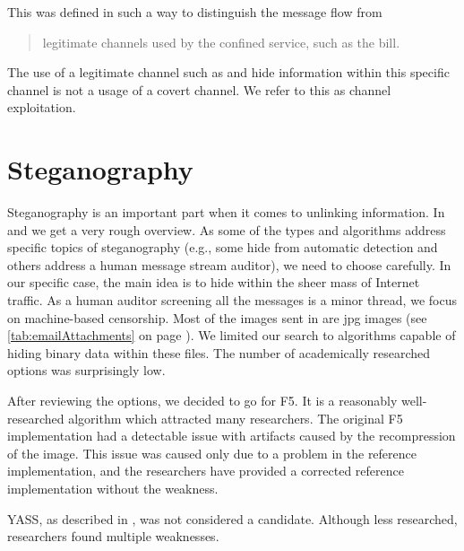 This was defined  in such a way to distinguish the message flow from 

\begin{quote}
	legitimate channels used by the confined service, such as the bill.
\end{quote}

The use of a legitimate channel such as  and hide information within this specific channel is not a usage of a covert channel. We refer to this as channel exploitation.

\section{Steganography}

Steganography is an important part when it comes to unlinking information. In \cite{6828087} and \cite{subhedar2014current} we get a very rough overview. As some of the types and algorithms address specific topics of steganography (e.g., some hide from automatic detection and others address a human message stream auditor), we need to choose carefully. In our specific case, the main idea is to hide within the sheer mass of Internet traffic. As a human auditor screening all the messages is a minor thread, we focus on machine-based censorship. Most of the images sent in  are jpg images (see \cref{tab:emailAttachments} on page \pageref{tab:emailAttachments}). We limited our search to algorithms capable of hiding binary data within these files. The number of academically researched options was surprisingly low.

After reviewing the options, we decided to go for F5\cite{f5}. It is a reasonably well-researched algorithm which attracted many researchers. The original F5 implementation had a detectable issue with artifacts\cite{F5broken} caused by the recompression of the image. This issue was caused only due to a problem in the reference implementation, and the researchers have provided a corrected reference implementation without the weakness.


YASS, as described in \cite{solanki2007yass}, was not considered a candidate. Although less researched, researchers found multiple weakness\-es\cite{kodovsky2010modern,li2009steganalysis}.


